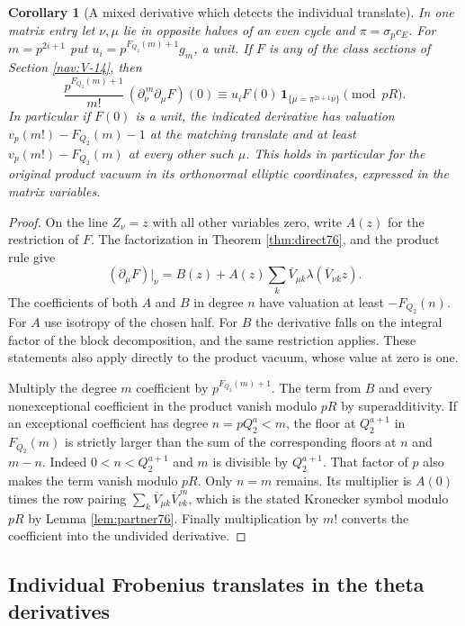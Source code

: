 \documentclass[a4paper,11pt]{article}
\newtheorem{corollary}[proposition]{Corollary}
\theoremstyle{definition}
\theoremstyle{remark}
\numberwithin{equation}{section}
\begin{document}
\begin{corollary}[A mixed derivative which detects the individual translate]
\label{cor:detect78}
In one matrix entry let \(\nu,\mu\) lie in opposite halves
of an even cycle and \(\pi=\sigma_pc_E\). For \(m=p^{2i+1}\) put
\(u_i=p^{F_{Q_2}(m)+1}g_m\), a unit. If \(F\) is any of the
class sections of Section \ref{nav:V-14}, then
\[
 \frac{p^{F_{Q_2}(m)+1}}{m!}\,
       (\partial_\nu^{\,m}\partial_\mu F)(0)
       \equiv u_i F(0)\,
          \mathbf1_{\{\mu=\pi^{2i+1}\nu\}}\pmod {pR}.
\]
In particular if \(F(0)\) is a unit, the indicated derivative
has valuation \(v_p(m!)-F_{Q_2}(m)-1\) at the matching
translate and at least \(v_p(m!)-F_{Q_2}(m)\) at every other
such \(\mu\). This holds in particular for the original product
vacuum in its orthonormal elliptic coordinates, expressed in
the matrix variables.
\end{corollary}
\begin{proof}
On the line \(Z_\nu=z\) with all other variables zero, write
\(A(z)\) for the restriction of \(F\). The factorization in
Theorem \ref{thm:direct76}, and the product rule give
\[
        (\partial_\mu F)|_{\nu}= B(z)+
             A(z)\sum_k\overline V_{\mu k}
                               \lambda(\overline V_{\nu k}z).
\]
The coefficients of both \(A\) and \(B\) in degree \(n\) have
valuation at least \(-F_{Q_2}(n)\). For \(A\) use isotropy
of the chosen half. For \(B\) the derivative falls on the
integral factor of the block decomposition, and the same
restriction applies. These statements also apply directly
to the product vacuum, whose value at zero is one.

Multiply the degree \(m\) coefficient by \(p^{F_{Q_2}(m)+1}\).
The term from \(B\) and every nonexceptional coefficient in
the product vanish modulo \(pR\) by superadditivity.
If an exceptional coefficient has degree \(n=pQ_2^a<m\), the
floor at \(Q_2^{a+1}\) in \(F_{Q_2}(m)\) is strictly larger
than the sum of the corresponding floors at \(n\) and \(m-n\).
Indeed \(0<n<Q_2^{a+1}\) and \(m\) is divisible by \(Q_2^{a+1}\).
That factor of \(p\) also makes the term vanish modulo \(pR\).
Only \(n=m\) remains. Its multiplier is \(A(0)\) times the row
pairing \(\sum_k\overline V_{\mu k}\overline V_{\nu k}^{\,m}\),
which is the stated Kronecker symbol modulo \(pR\) by Lemma \ref{lem:partner76}. Finally multiplication by \(m!\) converts the
coefficient into the undivided derivative.
\end{proof}

\subsection{Individual Frobenius translates in the theta derivatives}\label{nav:VI-00}
\label{sec:direct76}
\end{document}

